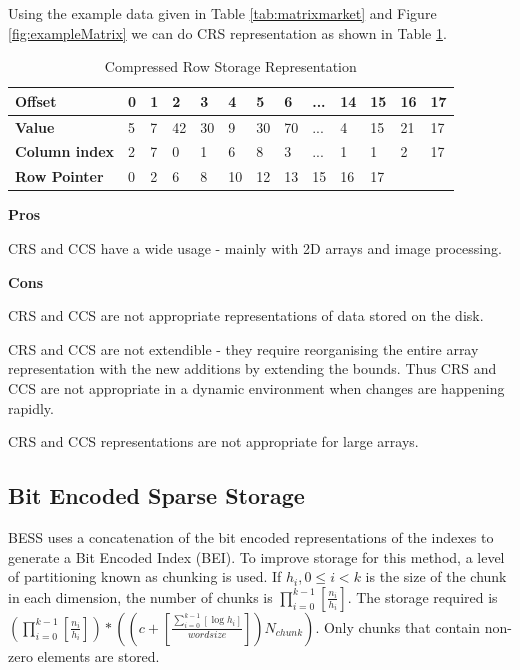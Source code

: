  Using the example data given in Table \ref{tab:matrixmarket} and Figure \ref{fig:exampleMatrix} we can do CRS representation as shown in Table \ref{tab:compressed}.
 
  \begin{table}[H]
 	\caption{Compressed Row Storage Representation\label{tab:compressed}}
 	\begin{center}
 		\begin{tabular}{lllllllllllll}
 			\hline
 			{\textbf{Offset}} & 0 & 1 & 2 & 3 & 4 & 5 & 6 & ...& 14 & 15 & 16 & 17\\
 			\hline
 			{\textbf{Value}} & 5 & 7 & 42 & 30 & 9 & 30 & 70 & ...& 4 & 15 & 21 & 17 \\
 			{\textbf{Column index}} & 2 & 7 & 0 & 1 & 6 & 8 & 3 & ... & 1 & 1 & 2 & 17\\
 			{\textbf{Row Pointer}} & 0 & 2 & 6 & 8 & 10 & 12 & 13 & 15 & 16 & 17 & & \\
 			\hline
 		\end{tabular}
 	\end{center}
 \end{table}

\textbf{Pros}
\begin{compactitem}
	\item CRS and CCS have a wide usage - mainly with 2D arrays and image processing.
\end{compactitem}

\textbf{Cons}
\begin{compactitem}
	\item CRS and CCS are not appropriate representations of data stored on the disk.
	\item CRS and CCS are not extendible - they require reorganising the entire array representation with the new additions by extending the bounds. Thus CRS and CCS are not appropriate in a dynamic environment when changes are happening rapidly.
	\item CRS and CCS representations are not appropriate for large arrays.
\end{compactitem}

\subsection{Bit Encoded Sparse Storage}
BESS uses a concatenation of the bit encoded representations of the indexes to generate a Bit Encoded Index (BEI). To improve storage for this method, a level of partitioning known as chunking is used. If $h_i, 0\leq i < k$ is the size of the chunk in each dimension, the number of chunks is $\prod_{i=0}^{k-1}[\frac{n_i}{h_i}]$. The storage required is $(\prod_{i=0}^{k-1}[\frac{n_i}{h_i}])*((c+ [\frac{\sum_{i=0}^{k-1}[\log h_i]}{wordsize}])N_{chunk})$. Only chunks that contain non-zero elements are stored.

